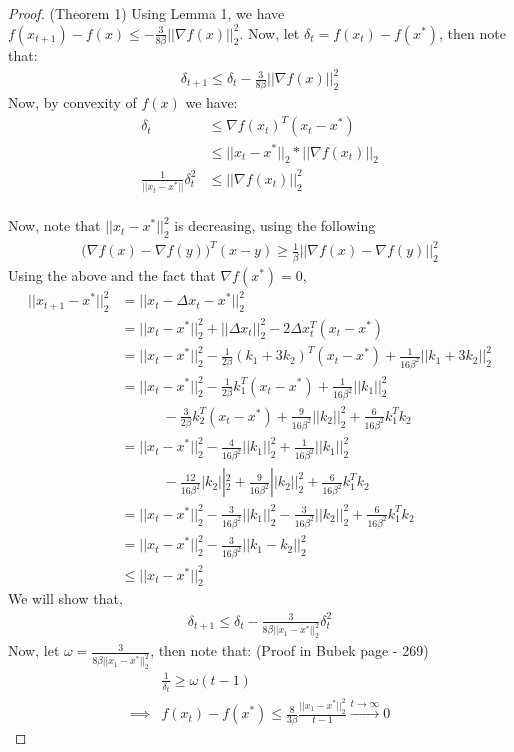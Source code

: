 \begin{proof}(Theorem 1)
Using Lemma 1, we have $f(x_{t+1}) - f(x) \leq -\frac{3}{8\beta}|| \nabla f(x) ||_2^2 $. Now, let $\delta_t = f(x_t) - f(x^*)$, then note that:
\begin{align*}
\delta_{t+1} \leq \delta_t - \frac{3}{8\beta}|| \nabla f(x) ||_2^2
\end{align*}
Now, by convexity of $f(x)$ we have:
\begin{align}
\delta_t &\leq \nabla f(x_t)^T (x_t - x^*) \\
 &\leq || x_t - x^* ||_2 * || \nabla f(x_t) ||_2 \\
\frac{1}{|| x_t - x^* || }\delta_t^2 & \leq  || \nabla f(x_t) ||_2^2 \\
\end{align}

Now, note that $|| x_t - x^*||_2^2$ is decreasing, using the following
\begin{align*}
\big( \nabla f(x) - \nabla f(y)  \big)^T(x-y)  \geq \frac{1}{\beta} || \nabla f(x) - \nabla f(y) ||_2^2
\end{align*}
Using the above and the fact that $\nabla f(x^*) = 0$,
\begin{align*}
|| x_{t+1} - x^* ||_2^2 &= || x_t - \Delta x_t - x^* ||_2^2 \\
&= || x_t - x^* ||_2^2 + || \Delta x_t ||_2^2 - 2 \Delta x_t^T(x_t - x^*) \\
&= || x_t - x^* ||_2^2 - \frac{1}{2\beta}(k_1 + 3k_2)^T (x_t - x^*) + \frac{1}{16 \beta^2}|| k_1 + 3k_2 ||_2^2 \\
&= || x_t - x^* ||_2^2 - \frac{1}{2 \beta}k_1^T (x_t - x^*) + \frac{1}{16 \beta^2}|| k_1 ||_2^2  \\
& \quad \quad \quad - \frac{3}{2\beta}k_2^T (x_t - x^*) + \frac{9}{16 \beta^2}|| k_2 ||_2^2 + \frac{6}{16 \beta^2} k_1 ^T k_2 \\
&= || x_t - x^* ||_2^2 - \frac{4}{16 \beta^2}||k_1 ||_2^2 + \frac{1}{16 \beta^2}|| k_1 ||_2^2  \\
& \quad \quad \quad - \frac{12}{16 \beta^2}|k_2||_2^2 + \frac{9}{16 \beta^2}|| k_2 ||_2^2 + \frac{6}{16 \beta^2} k_1 ^T k_2 \\
&= || x_t - x^* ||_2^2 - \frac{3}{16 \beta^2}||k_1||_2^2 - \frac{3}{16 \beta^2}||k_2||_2^2 + \frac{6}{16 \beta^2} k_1 ^T k_2 \\
&= || x_t - x^* ||_2^2 -  \frac{3}{16 \beta^2}|| k_1 - k_2||_2^2  \\
& \leq || x_t - x^* ||_2^2
\end{align*}
We will show that,
\begin{align}
\delta_{t+1} \leq \delta_t - \frac{3}{ 8 \beta || x_1 - x^* ||_2^2} \delta_t^2
\end{align}
Now, let $\omega = \frac{3}{8 \beta   || x_1 - x^* ||_2^2}$, then note that: (Proof in Bubek page - 269)
\begin{align*}
& \frac{1}{\delta_t} \geq \omega (t-1) \\
\implies & f(x_t) - f(x^*) \leq \frac{8}{3 \beta} \frac{ || x_1 - x^* ||_2^2}{t-1} \xrightarrow{t \to \infty} 0
\end{align*}
\end{proof}

